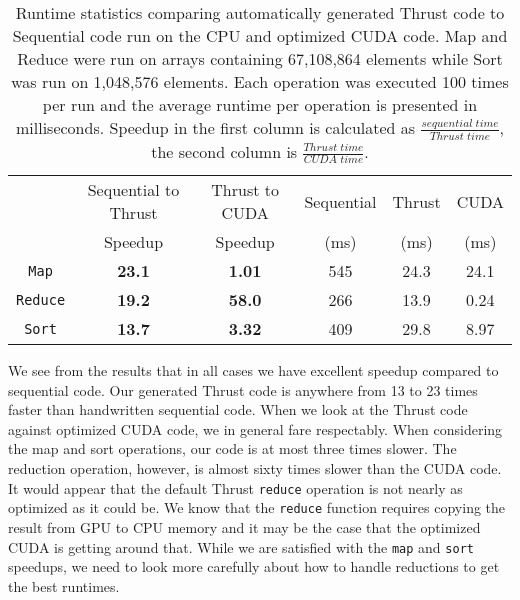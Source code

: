 \documentclass[twocolumn]{article}
\renewcommand{\|}{\origbar} %
\newcommand{\code}[1]{\texttt{#1}}
\begin{document}
\begin{table*}
  \centering
\begin{tabular}{| c || c|c || c|c|c |}
  \hline
                 & Sequential to Thrust & Thrust to CUDA & Sequential & Thrust & CUDA \\
                 &       Speedup                   &       Speedup             &    (ms)   &  (ms) & (ms) \\ \hline \hline
  \code{Map}     &  {\bf 23.1}                     & {\bf 1.01}                & 545       & 24.3  & 24.1 \\
  \code{Reduce}  &  {\bf 19.2}                     & {\bf 58.0}                & 266       & 13.9  & 0.24 \\
  \code{Sort}    &  {\bf 13.7}                     & {\bf 3.32}                & 409       & 29.8  & 8.97 \\ \hline
\end{tabular}
\caption{Runtime statistics comparing automatically generated Thrust code to Sequential code run on the CPU and optimized CUDA code. Map and Reduce were run on arrays containing 67,108,864 elements while Sort was run on 1,048,576 elements. Each operation was executed 100 times per run and the average runtime per operation is presented in milliseconds. Speedup in the first column is calculated as $\frac{sequential\; time}{Thrust\; time}$, the second column is $\frac{Thrust\; time}{CUDA\; time}$.}
\label{table:runtimes}
\end{table*}

We see from the results that in all cases we have excellent speedup compared to sequential code. Our generated Thrust code is anywhere from 13 to 23 times faster than handwritten sequential code. When we look at the Thrust code against optimized CUDA code, we in general fare respectably. When considering the map and sort operations, our code is at most three times slower. The reduction operation, however, is almost sixty times slower than the CUDA code. It would appear that the default Thrust \code{reduce} operation is not nearly as optimized as it could be. We know that the \code{reduce} function requires copying the result from GPU to CPU memory and it may be the case that the optimized CUDA is getting around that. While we are satisfied with the \code{map} and \code{sort} speedups, we need to look more carefully about how to handle reductions to get the best runtimes. 
\end{document}
